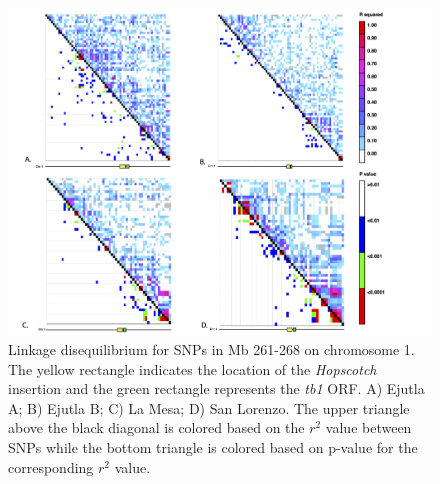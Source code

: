 \documentclass[11pt]{article} %
\begin{document}
\begin{linenumbers}
\begin{flushleft}
\begin{figure}[!t]
  \begin{center}
   \includegraphics[width=180mm]{Fig2LDPlots.png}
   \end{center}
    \caption{Linkage disequilibrium for SNPs in Mb 261-268 on chromosome 1. The yellow rectangle indicates the location of the \emph{Hopscotch} insertion and the green rectangle represents the \emph{tb1} ORF. A) Ejutla A; B) Ejutla B; C) La Mesa; D) San Lorenzo. The upper triangle above the black diagonal is colored based on the $r^{2}$ value between SNPs while the bottom triangle is colored based on p-value for the corresponding  $r^{2}$ value.}
\label{Fig2LD}
\end{figure}
\clearpage


\end{flushleft}
\end{linenumbers}
\end{document}
